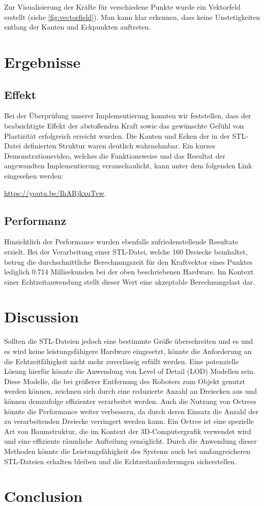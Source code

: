 \documentclass[conference]{IEEEtran}
\begin{document}
Zur Visualisierung der Kräfte für verschiedene Punkte wurde ein Vektorfeld erstellt (siehe \ref{fig:vectorfield}). Man kann klar erkennen, dass keine Unstetigkeiten entlang der Kanten und Eckpunkten auftreten.


\section{Ergebnisse}

\subsection{Effekt}
Bei der Überprüfung unserer Implementierung konnten wir feststellen, dass der beabsichtigte Effekt der abstoßenden Kraft sowie das gewünschte Gefühl von Plastizität erfolgreich erreicht wurden. Die Kanten und Ecken der in der STL-Datei definierten Struktur waren deutlich wahrnehmbar. Ein kurzes Demonstrationsvideo, welches die Funktionsweise und das Resultat der angewandten Implementierung veranschaulicht, kann unter dem folgenden Link eingesehen werden:
\begin{minipage}{\textwidth}
    \nobreak\url{https://youtu.be/IhARjkxuTvw}.
\end{minipage}

\subsection{Performanz}
Hinsichtlich der Performance wurden ebenfalls zufriedenstellende Resultate erzielt. Bei der Verarbeitung einer STL-Datei, welche 160 Dreiecke beinhaltet, betrug die durchschnittliche Berechnungszeit für den Kraftvektor eines Punktes lediglich 0.714 Millisekunden bei der oben beschriebenen Hardware. Im Kontext einer Echtzeitanwendung stellt dieser Wert eine akzeptable Berechnungslast dar. 

\section{Discussion}
Sollten die STL-Dateien jedoch eine bestimmte Größe überschreiten und es und es wird keine leistungsfähigere Hardware eingesetzt, könnte die Anforderung an die Echtzeitfähigkeit nicht mehr zuverlässig erfüllt werden. Eine potenzielle Lösung hierfür könnte die Anwendung von Level of Detail (LOD) Modellen sein. Diese Modelle, die bei größerer Entfernung des Roboters zum Objekt genutzt werden können, zeichnen sich durch eine reduzierte Anzahl an Dreiecken aus und können demzufolge effizienter verarbeitet werden. Auch die Nutzung von Octrees könnte die Performance weiter verbessern, da durch deren Einsatz die Anzahl der zu verarbeitenden Dreiecke verringert werden kann. Ein Octree ist eine spezielle Art von Baumstruktur, die im Kontext der 3D-Computergrafik verwendet wird und eine effiziente räumliche Aufteilung ermöglicht. Durch die Anwendung dieser Methoden könnte die Leistungsfähigkeit des Systems auch bei umfangreicheren STL-Dateien erhalten bleiben und die Echtzeitanforderungen sicherstellen.

\section{Conclusion}

\printbibliography
\end{document}
